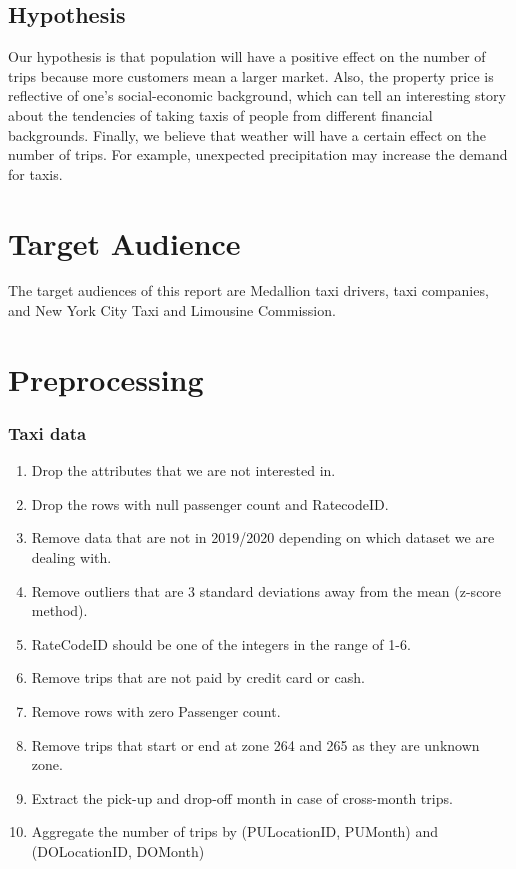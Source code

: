 \documentclass[11pt]{article}
\begin{document}
\subsection{Hypothesis}
Our hypothesis is that population will have a positive effect on the number of trips because more customers mean a larger market. Also, the property price is reflective of one's social-economic background, which can tell an interesting story about the tendencies of taking taxis of people from different financial backgrounds. Finally, we believe that weather will have a certain effect on the number of trips. For example, unexpected precipitation may increase the demand for taxis.
\section{Target Audience}
The target audiences of this report are Medallion taxi drivers, taxi companies, and New York City Taxi and Limousine Commission. 
\section{Preprocessing}
\subsubsection{Taxi data}
\begin{enumerate} 
    \item Drop the attributes that we are not interested in.
    \item Drop the rows with null passenger count and RatecodeID.
    \item Remove data that are not in 2019/2020 depending on which dataset we are dealing with.
    \item Remove outliers that are 3 standard deviations away from the mean (z-score method).
    \item RateCodeID should be one of the integers in the range of 1-6.
    \item Remove trips that are not paid by credit card or cash.
    \item Remove rows with zero Passenger count.
    \item Remove trips that start or end at zone 264 and 265 as they are unknown zone.
    \item Extract the pick-up and drop-off month in case of cross-month trips.
    \item Aggregate the number of trips by (PULocationID, PUMonth) and (DOLocationID, DOMonth)
\end{enumerate}
\end{document}
